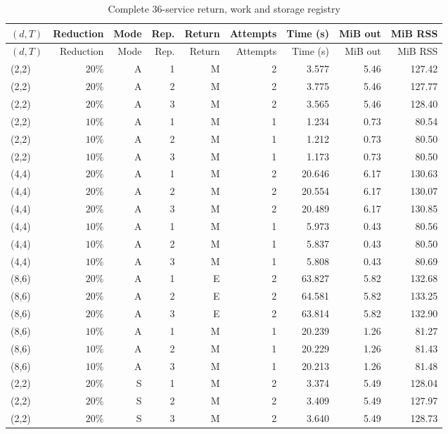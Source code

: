 \begingroup\footnotesize\setlength{\tabcolsep}{3pt}
\begin{longtable}{lrrrrrrrr}
\caption{Complete 36-service return, work and storage registry}\label{tab:services59}\\
\hline
$(d,T)$ & Reduction & Mode & Rep. & Return & Attempts & Time (s) & MiB out & MiB RSS \\
\hline
\endfirsthead
$(d,T)$ & Reduction & Mode & Rep. & Return & Attempts & Time (s) & MiB out & MiB RSS \\
\hline
\endhead
(2,2) & $20\%$ & A & 1 & M & 2 & 3.577 & 5.46 & 127.42 \\
(2,2) & $20\%$ & A & 2 & M & 2 & 3.775 & 5.46 & 127.77 \\
(2,2) & $20\%$ & A & 3 & M & 2 & 3.565 & 5.46 & 128.40 \\
(2,2) & $10\%$ & A & 1 & M & 1 & 1.234 & 0.73 & 80.54 \\
(2,2) & $10\%$ & A & 2 & M & 1 & 1.212 & 0.73 & 80.50 \\
(2,2) & $10\%$ & A & 3 & M & 1 & 1.173 & 0.73 & 80.50 \\
(4,4) & $20\%$ & A & 1 & M & 2 & 20.646 & 6.17 & 130.63 \\
(4,4) & $20\%$ & A & 2 & M & 2 & 20.554 & 6.17 & 130.07 \\
(4,4) & $20\%$ & A & 3 & M & 2 & 20.489 & 6.17 & 130.85 \\
(4,4) & $10\%$ & A & 1 & M & 1 & 5.973 & 0.43 & 80.56 \\
(4,4) & $10\%$ & A & 2 & M & 1 & 5.837 & 0.43 & 80.50 \\
(4,4) & $10\%$ & A & 3 & M & 1 & 5.808 & 0.43 & 80.69 \\
(8,6) & $20\%$ & A & 1 & E & 2 & 63.827 & 5.82 & 132.68 \\
(8,6) & $20\%$ & A & 2 & E & 2 & 64.581 & 5.82 & 133.25 \\
(8,6) & $20\%$ & A & 3 & E & 2 & 63.814 & 5.82 & 132.90 \\
(8,6) & $10\%$ & A & 1 & M & 1 & 20.239 & 1.26 & 81.27 \\
(8,6) & $10\%$ & A & 2 & M & 1 & 20.229 & 1.26 & 81.43 \\
(8,6) & $10\%$ & A & 3 & M & 1 & 20.213 & 1.26 & 81.48 \\
(2,2) & $20\%$ & S & 1 & M & 2 & 3.374 & 5.49 & 128.04 \\
(2,2) & $20\%$ & S & 2 & M & 2 & 3.409 & 5.49 & 127.97 \\
(2,2) & $20\%$ & S & 3 & M & 2 & 3.640 & 5.49 & 128.73 \\

\end{longtable}
